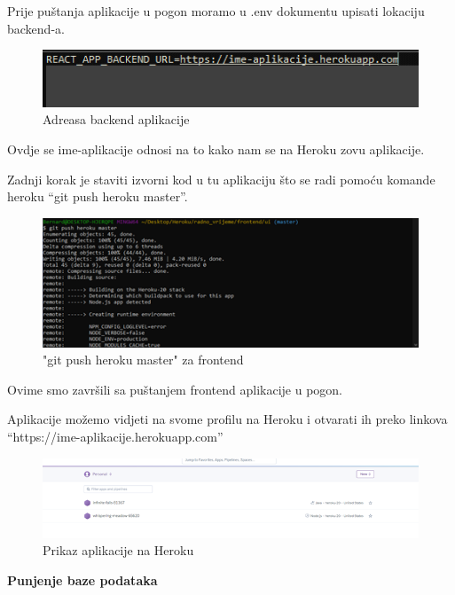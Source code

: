 Prije puštanja aplikacije u pogon moramo u .env dokumentu upisati lokaciju backend-a. 
				\begin{figure}[H] 					\centering 					                \includegraphics[width=\textwidth]{Dokumentacija/pogon/Picture7.png}
				\caption{Adreasa backend aplikacije}
				\end{figure}
				Ovdje se ime-aplikacije odnosi na to kako nam se na Heroku zovu aplikacije. 

Zadnji korak je staviti izvorni kod u tu aplikaciju što se radi pomoću komande heroku “git push heroku master”. 
				\begin{figure}[H] 					\centering 					                \includegraphics[width=\textwidth]{Dokumentacija/pogon/Picture8.png}
				\caption{"git push heroku master" za frontend}
				\end{figure}
				Ovime smo završili sa puštanjem frontend aplikacije u pogon. 

Aplikacije možemo vidjeti na svome profilu na Heroku i otvarati ih preko linkova “https://ime-aplikacije.herokuapp.com” 
				\begin{figure}[H] 					\centering 					                \includegraphics[width=\textwidth]{Dokumentacija/pogon/Picture9.png}
				\caption{Prikaz aplikacije na Heroku}
				\end{figure}
				
				

\textbf{Punjenje baze podataka} 

